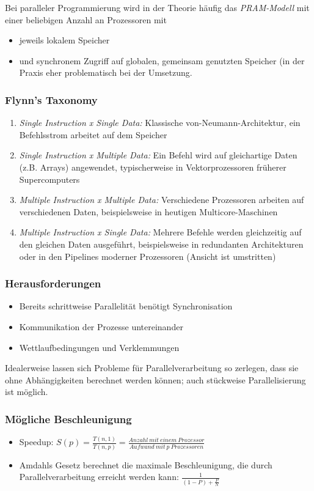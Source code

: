 Bei paralleler Programmierung wird in der Theorie häufig das \textit{PRAM-Modell} mit einer beliebigen Anzahl an Prozessoren mit
\begin{itemize}
	\item jeweils lokalem Speicher
	\item und synchronem Zugriff auf globalen, gemeinsam genutzten Speicher (in der Praxis eher problematisch bei der Umsetzung.
\end{itemize}

\subsubsection{Flynn's Taxonomy}
\begin{enumerate}
	\item \textit{Single Instruction x Single Data:} Klassische von-Neumann-Architektur, ein Befehlsstrom arbeitet auf dem Speicher
	\item \textit{Single Instruction x Multiple Data:} Ein Befehl wird auf gleichartige Daten (z.B. Arrays) angewendet, typischerweise in Vektorprozessoren früherer Supercomputers
	\item \textit{Multiple Instruction x Multiple Data:} Verschiedene Prozessoren arbeiten auf verschiedenen Daten, beispielsweise in heutigen Multicore-Maschinen
	\item \textit{Multiple Instruction x Single Data:} Mehrere Befehle werden gleichzeitig auf den gleichen Daten ausgeführt, beispielsweise in redundanten Architekturen oder in den Pipelines moderner Prozessoren (Ansicht ist umstritten)
\end{enumerate}

\subsubsection{Herausforderungen}
\begin{itemize}
	\item Bereits schrittweise Parallelität benötigt Synchronisation
	\item Kommunikation der Prozesse untereinander
	\item Wettlaufbedingungen und Verklemmungen
\end{itemize}
Idealerweise lassen sich Probleme für Parallelverarbeitung so zerlegen, dass sie ohne Abhängigkeiten berechnet werden können; auch stückweise Parallelisierung ist möglich.

\subsubsection{Mögliche Beschleunigung}
\begin{itemize}
	\item Speedup: \(S(p) = \frac{T(n,1)}{T(n,p)} = \frac{Anzahl~mit~einem~Prozessor}{Aufwand~mit~p~Prozessoren}\)
	\item Amdahls Gesetz berechnet die maximale Beschleunigung, die durch Parallelverarbeitung erreicht werden kann: \(\frac{1}{(1-P)+\frac{P}{N}}\)
\end{itemize}


